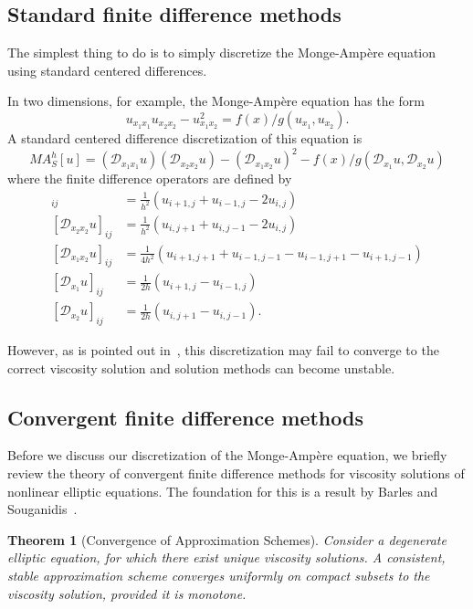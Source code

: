 \documentclass{amsart}
\newtheorem{theorem}{Theorem}
\theoremstyle{lemma}
\theoremstyle{remark}
\begin{document}
\subsection{Standard finite difference methods}\label{sec:standardFD}
The simplest thing to do is to simply discretize the {{Monge-Amp\`ere}\xspace} equation using standard centered differences.  

In two dimensions, for example, the {{Monge-Amp\`ere}\xspace} equation has the form
\[ u_{x_1x_1}u_{x_2x_2}-u_{x_1x_2}^2 = f(x)/g(u_{x_1},u_{x_2}). \]
A standard centered difference discretization of this equation is
\begin{equation}\label{eq:discStand} 
MA^h_S[u] = ({\mathcal{D}}_{x_1x_1}u)({\mathcal{D}}_{x_2x_2}u) - ({\mathcal{D}}_{x_1x_2}u)^2 - f(x)/g({\mathcal{D}}_{x_1}u,{\mathcal{D}}_{x_2}u)
\end{equation}
where the finite difference operators are defined by
\begin{align*}
[{\mathcal{D}}_{x_1x_1}u]_{ij} &= \frac{1}{h^2} 
\left(
{u_{i+1,j}+u_{i-1,j}-2u_{i,j}}
\right)
\\
[{\mathcal{D}}_{x_2x_2}u]_{ij} &= \frac{1}{h^2}
\left(
u_{i,j+1}+u_{i,j-1}-2u_{i,j}
\right)
\\
[{\mathcal{D}}_{x_1x_2}u]_{ij} &= \frac{1}{4h^2}
\left(
u_{i+1,j+1}+u_{i-1,j-1}-u_{i-1,j+1}-u_{i+1,j-1}
\right)
\\
[{\mathcal{D}}_{x_1}u]_{ij} &= \frac{1}{2h}
\left(
u_{i+1,j}-u_{i-1,j}
\right)\\
[{\mathcal{D}}_{x_2}u]_{ij} &= \frac{1}{2h}
\left(
u_{i,j+1}-u_{i,j-1}
\right).
\end{align*}

However, as is pointed out in~\cite{FONum}, this discretization may fail to converge to the correct viscosity solution and solution methods can become unstable.

\subsection{Convergent finite difference methods}\label{sec:fd}
Before we discuss our discretization of the {{Monge-Amp\`ere}\xspace} equation, we briefly review the theory of convergent finite difference methods for viscosity solutions of nonlinear elliptic equations.  The foundation for this is a result by Barles and Souganidis~\cite{BSnum}.

\begin{theorem}[Convergence of Approximation Schemes]
Consider a degenerate elliptic equation, for which there exist unique viscosity solutions.  A consistent, stable approximation scheme converges uniformly on compact subsets to the viscosity solution, provided it is monotone.
\end{theorem}
\end{document}

